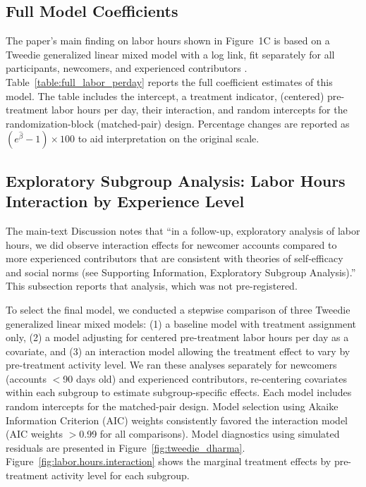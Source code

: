 \documentclass[9pt,twoside,lineno]{pnas-new}
\begin{document}
\subsection*{Full Model Coefficients}
The paper's main finding on labor hours shown in Figure~1C is based on a Tweedie generalized linear mixed model with a log link, fit separately for all participants, newcomers, and experienced contributors \cite{brooks_glmmtmb_2017}. Table~\ref{table:full_labor_perday} reports the full coefficient estimates of this model. The table includes the intercept, a treatment indicator, (centered) pre-treatment labor hours per day, their interaction, and random intercepts for the randomization-block (matched-pair) design. Percentage changes are reported as $(e^{\hat{\beta}} - 1) \times 100$ to aid interpretation on the original scale. %

\subsection*{Exploratory Subgroup Analysis: Labor Hours Interaction by Experience Level}
The main-text Discussion notes that ``in a follow-up, exploratory analysis of labor hours, we did observe interaction effects for newcomer accounts compared to more experienced contributors that are consistent with theories of self-efficacy and social norms (see Supporting Information, Exploratory Subgroup Analysis).'' This subsection reports that analysis, which was not pre-registered.

To select the final model, we conducted a stepwise comparison of three Tweedie generalized linear mixed models: (1) a baseline model with treatment assignment only, (2) a model adjusting for centered pre-treatment labor hours per day as a covariate, and (3) an interaction model allowing the treatment effect to vary by pre-treatment activity level. We ran these analyses separately for newcomers (accounts $<$90 days old) and experienced contributors, re-centering covariates within each subgroup to estimate subgroup-specific effects. Each model includes random intercepts for the matched-pair design. Model selection using Akaike Information Criterion (AIC) weights \cite{burnham_model_2002} consistently favored the interaction model (AIC weights $>$0.99 for all comparisons). Model diagnostics using simulated residuals \cite{hartig_dharma_2022} are presented in Figure~\ref{fig:tweedie_dharma}. Figure~\ref{fig:labor.hours.interaction} shows the marginal treatment effects by pre-treatment activity level for each subgroup.
\end{document}
